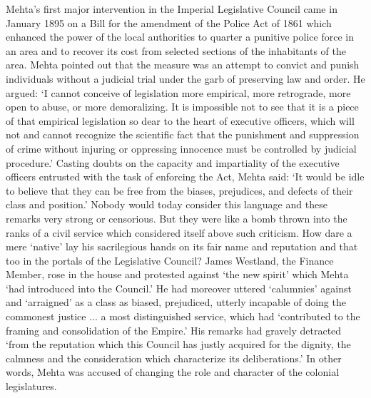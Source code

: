 Mehta's first major intervention in the Imperial Legislative Council came in January 1895 on a Bill for the amendment of the Police Act of 1861 which enhanced the power of the local authorities to quarter a punitive police force in an area and to recover its cost from selected sections of the inhabitants of the area. Mehta pointed out that the measure was an attempt to convict and punish individuals without a judicial trial under the garb of preserving law and order. He argued: `I cannot conceive of legislation more empirical, more retrograde, more open to abuse, or more demoralizing. It is impossible not to see that it is a piece of that empirical legislation so dear to the heart of executive officers, which will not and cannot recognize the scientific fact that the punishment and suppression of crime without injuring or oppressing innocence must be controlled by judicial procedure.' Casting doubts on the capacity and impartiality of the executive officers entrusted with the task of enforcing the Act, Mehta said: `It would be idle to believe that they can be free from the biases, prejudices, and defects of their class and position.' Nobody would today consider this language and these remarks very strong or censorious. But they were like a bomb thrown into the ranks of a civil service which considered itself above such criticism. How dare a mere `native' lay his sacrilegious hands on its fair name and reputation and that too in the portals of the Legislative Council? James Westland, the Finance Member, rose in the house and protested against `the new spirit' which Mehta `had introduced into the Council.' He had moreover uttered `calumnies' against and `arraigned' as a class as biased, prejudiced, utterly incapable of doing the commonest justice ... a most distinguished service, which had `contributed to the framing and consolidation of the Empire.' His remarks had gravely detracted `from the reputation which this Council has justly acquired for the dignity, the calmness and the consideration which characterize its deliberations.' In other words, Mehta was accused of changing the role and character of the colonial legislatures.

